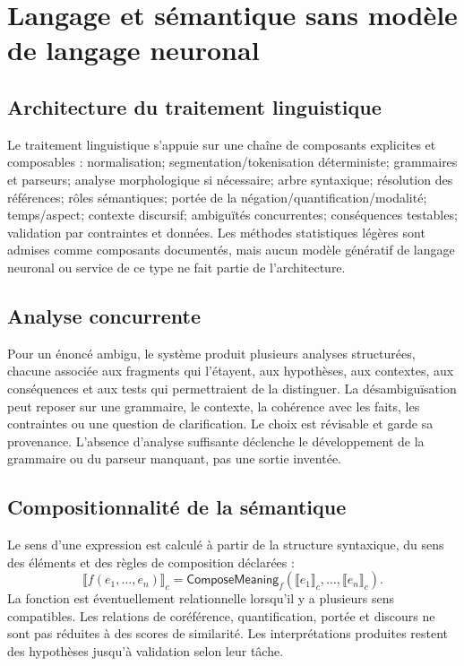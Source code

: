 \documentclass[11pt,a4paper]{article}
\begin{document}
\section{Langage et sémantique sans modèle de langage neuronal}
\subsection{Architecture du traitement linguistique}
Le traitement linguistique s'appuie sur une chaîne de composants explicites et composables : normalisation; segmentation/tokenisation déterministe; grammaires et parseurs; analyse morphologique si nécessaire; arbre syntaxique; résolution des références; rôles sémantiques; portée de la négation/quantification/modalité; temps/aspect; contexte discursif; ambiguïtés concurrentes; conséquences testables; validation par contraintes et données. Les méthodes statistiques légères sont admises comme composants documentés, mais aucun modèle génératif de langage neuronal ou service de ce type ne fait partie de l'architecture.

\subsection{Analyse concurrente}
Pour un énoncé ambigu, le système produit plusieurs analyses structurées, chacune associée aux fragments qui l'étayent, aux hypothèses, aux contextes, aux conséquences et aux tests qui permettraient de la distinguer. La désambiguïsation peut reposer sur une grammaire, le contexte, la cohérence avec les faits, les contraintes ou une question de clarification. Le choix est révisable et garde sa provenance. L'absence d'analyse suffisante déclenche le développement de la grammaire ou du parseur manquant, pas une sortie inventée.

\subsection{Compositionnalité de la sémantique}
Le sens d'une expression est calculé à partir de la structure syntaxique, du sens des éléments et des règles de composition déclarées :
\[
\llbracket f(e_1,\ldots,e_n)\rrbracket_c = \mathsf{ComposeMeaning}_f(\llbracket e_1\rrbracket_c,\ldots,\llbracket e_n\rrbracket_c).
\]
La fonction est éventuellement relationnelle lorsqu'il y a plusieurs sens compatibles. Les relations de coréférence, quantification, portée et discours ne sont pas réduites à des scores de similarité. Les interprétations produites restent des hypothèses jusqu'à validation selon leur tâche.
\end{document}
